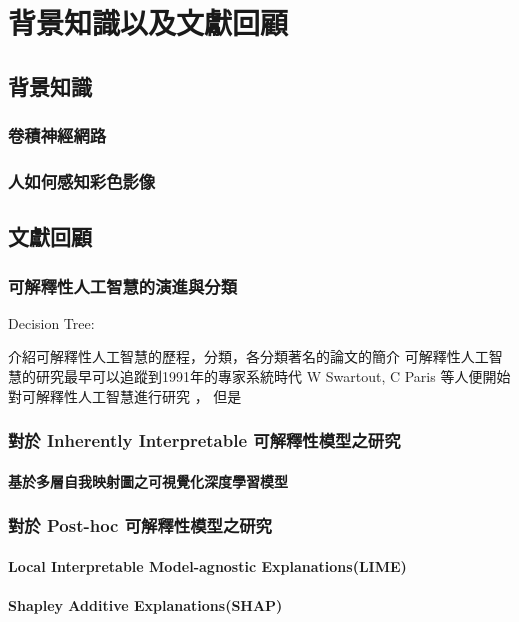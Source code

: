 \documentclass[class=NCU_thesis, crop=false]{standalone}
\begin{document}
\chapter{背景知識以及文獻回顧}
\section{背景知識}
\subsection{卷積神經網路}




\subsection{人如何感知彩色影像}


\section{文獻回顧}

\subsection{可解釋性人工智慧的演進與分類}
Decision Tree:
\cite{rokach2016decision}
\cite{grinsztajn2022treebased}

介紹可解釋性人工智慧的歷程，分類，各分類著名的論文的簡介
可解釋性人工智慧的研究最早可以追蹤到1991年的專家系統時代 W Swartout, C Paris 等人便開始對可解釋性人工智慧進行研究 \cite{87686}，
但是

\subsection{對於 Inherently Interpretable 可解釋性模型之研究}
\subsubsection{基於多層自我映射圖之可視覺化深度學習模型}

\subsection{對於 Post-hoc 可解釋性模型之研究}
\subsubsection{Local Interpretable Model-agnostic Explanations(LIME)} 
\subsubsection{Shapley Additive Explanations(SHAP)}
\end{document}
